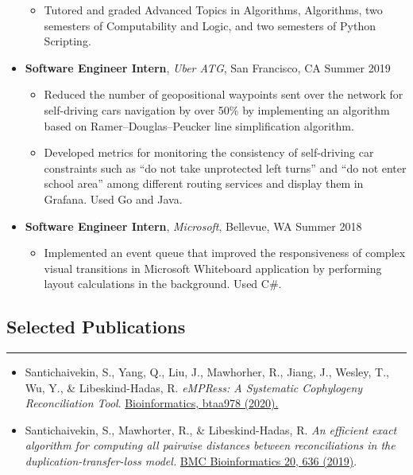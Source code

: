 \documentclass[10pt,letterpaper]{article}
\begin{document}
\begin{itemize}[label={},leftmargin=*]
\begin{itemize}[label=\textbullet]
      \itemsep0em
      \item Tutored and graded Advanced Topics in Algorithms, Algorithms, two semesters of Computability and Logic, and two semesters of Python Scripting.
    \end{itemize}
    \item
    {\textbf{Software Engineer Intern}, \textit{Uber ATG}, San Francisco, CA \hfill {Summer 2019}}
    \begin{itemize}[label=\textbullet]
      \itemsep0em
      \item Reduced the number of geopositional waypoints sent over the network for self-driving cars navigation by over 50\% by implementing an algorithm based on Ramer–Douglas–Peucker line simplification algorithm.
      \item Developed metrics for monitoring the consistency of self-driving car constraints such as ``do not take unprotected left turns'' and ``do not enter school area'' among different routing services and display them in Grafana. Used Go and Java.
    \end{itemize}
    \item
    {\textbf{Software Engineer Intern}, \textit{Microsoft}, Bellevue, WA \hfill {Summer 2018}}
    \begin{itemize}[label=\textbullet]
      \itemsep0em
      \item Implemented an event queue that improved the responsiveness of complex visual transitions in Microsoft Whiteboard application by performing layout calculations in the background. Used C\#.
    \end{itemize}
  \end{itemize}


\subsection*{Selected Publications}
\vspace{-0.2em}
\hrule
\vspace{1em}
\begin{itemize}[label={},leftmargin=*]
  \setlength\itemsep{0.8em}
    \parskip=-0.2em
  \item Santichaivekin, S., Yang, Q., Liu, J., Mawhorher, R., Jiang, J., Wesley, T., Wu, Y., \& Libeskind-Hadas, R. \textit{eMPRess: A Systematic Cophylogeny Reconciliation Tool}. \href{https://doi.org/10.1093/bioinformatics/btaa978}{Bioinformatics, btaa978 (2020).}
  \item Santichaivekin, S., Mawhorter, R., \& Libeskind-Hadas, R. \textit{An efficient exact algorithm for computing all pairwise distances between reconciliations in the duplication-transfer-loss model.} \href{https://doi.org/10.1186/s12859-019-3203-9}{BMC Bioinformatics 20, 636 (2019)}.
\end{itemize}
\end{document}
